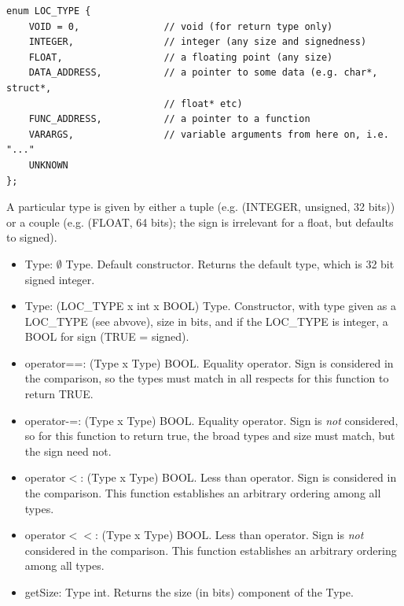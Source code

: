 \begin{verbatim}
enum LOC_TYPE {
    VOID = 0,               // void (for return type only)
    INTEGER,                // integer (any size and signedness)
    FLOAT,                  // a floating point (any size)
    DATA_ADDRESS,           // a pointer to some data (e.g. char*, struct*,
                            // float* etc)
    FUNC_ADDRESS,           // a pointer to a function
    VARARGS,                // variable arguments from here on, i.e. "..."
    UNKNOWN
};
\end{verbatim}

A particular type is given by either a tuple (e.g. (INTEGER, unsigned, 32 bits))
or a couple (e.g. (FLOAT, 64 bits); the sign is irrelevant for a float, but
defaults to signed).

\begin{itemize}
\item   Type: $\emptyset$ \ra Type.
    Default constructor. Returns the default type, which is 32 bit signed
    integer.

\item   Type: (LOC\_TYPE x int x BOOL) \ra Type.
    Constructor, with type given as a LOC\_TYPE (see abvove), size in bits,
    and if the LOC\_TYPE is integer, a BOOL for sign (TRUE = signed).

\item   operator==: (Type x Type) \ra BOOL.
    Equality operator. Sign is considered in the comparison, so the types must
    match in all respects for this function to return TRUE.

\item   operator-=: (Type x Type) \ra BOOL.
    Equality operator. Sign is {\it not} considered, so for this function to
    return true, the broad types and size must match, but the sign need not.

\item   operator$<$: (Type x Type) \ra BOOL.
    Less than operator. Sign is considered in the comparison.
    This function establishes an arbitrary ordering among all types.

\item   operator$<<$: (Type x Type) \ra BOOL.
    Less than operator. Sign is {\it not} considered in the comparison.
    This function establishes an arbitrary ordering among all types.

\item   getSize: Type \ra int.
    Returns the size (in bits) component of the Type.


\end{itemize}
